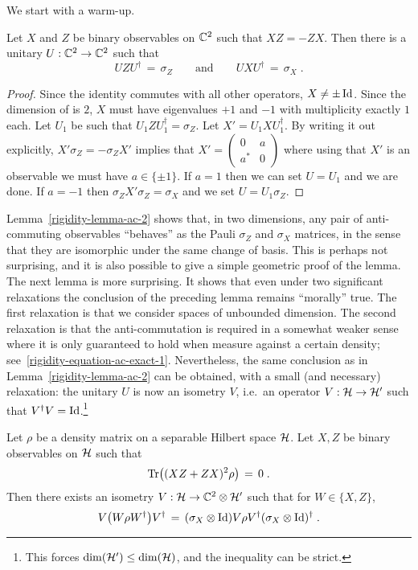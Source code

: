 We start with a warm-up. 

\begin{lemma}\label{lemma-ac-2}
Let $X$ and $Z$ be binary observables on $\mathbb{C}^2$ such that $XZ=-ZX$. Then there is a unitary  $U:\mathbb{C}^2\to\mathbb{C}^2$ such that 
 \[ U Z U^\dagger \,=\,\sigma_Z\qquad\text{and}\qquad  U X U^\dagger \,=\,\sigma_X\;.\]
\end{lemma}

\begin{proof}
Since the identity commutes with all other operators, $X\neq \pm \mathop{\rm Id}\nolimits$. Since the dimension of is $2$, $X$ must have eigenvalues $+1$ and $-1$ with multiplicity exactly $1$ each. Let $U_1$ be such that $U_1 Z U_1^\dagger = \sigma_Z$. Let $X'= U_1 X U_1^\dagger$. By writing it out explicitly, $X' \sigma_Z = -\sigma_Z X'$ implies that $X' = \begin{pmatrix} 0 & a \\ a^* & 0 \end{pmatrix}$ where using that $X'$ is an observable we must have $a\in \{\pm 1\}$. If $a=1$ then we can set $U=U_1$ and we are done. If $a=-1$ then $\sigma_Z X' \sigma_Z = \sigma_X$ and we set $U= U_1 \sigma_Z$. 
\end{proof}

Lemma~\ref{rigidity-lemma-ac-2} shows that, in two dimensions, any pair of anti-commuting observables ``behaves'' as the Pauli $\sigma_Z$ and $\sigma_X$ matrices, in the sense that they are isomorphic under the same change of basis. This is perhaps not surprising, and it is also possible to give a simple geometric proof of the lemma. The next lemma is more surprising. It shows that even under two significant relaxations the conclusion of the preceding lemma remains ``morally'' true. The first relaxation is that we consider spaces of unbounded dimension. The second relaxation is that the anti-commutation is required in a somewhat weaker sense where it is only guaranteed to hold when measure against a certain density; see~\eqref{rigidity-equation-ac-exact-1}. Nevertheless, the same conclusion as in Lemma~\ref{rigidity-lemma-ac-2} can be obtained, with a small (and necessary) relaxation: the unitary $U$ is now an isometry $V$, i.e.\ an operator $V:\mathcal{H} \to \mathcal{H}'$ such that $V^\dagger V = \mathop{\rm Id}\nolimits$.\footnote{This forces $\dim(\mathcal{H}')\leq \dim(\mathcal{H})$, and the inequality can be strict.}

\begin{lemma}\label{lemma-ac-exact}
Let $\rho$ be a density matrix on a separable Hilbert space $\mathcal{H}$. Let $X,Z$ be binary observables on $\mathcal{H}$ such that 
\begin{equation}\label{equation-ac-exact-1}
\mathrm{Tr}\big( (XZ+ZX)^2 \rho\big)\,=\,0\;.
\end{equation}
Then there exists an isometry $V: \mathcal{H} \to \mathbb{C}^2 \otimes \mathcal{H}'$ such that for $W\in\{X,Z\}$,
\[ V \big( W\rho W^\dagger\big) V^\dagger \,=\, (\sigma_X \otimes \mathop{\rm Id}\nolimits)V\rho V^\dagger (\sigma_X \otimes \mathop{\rm Id}\nolimits)^\dagger\;.\]
\end{lemma}

